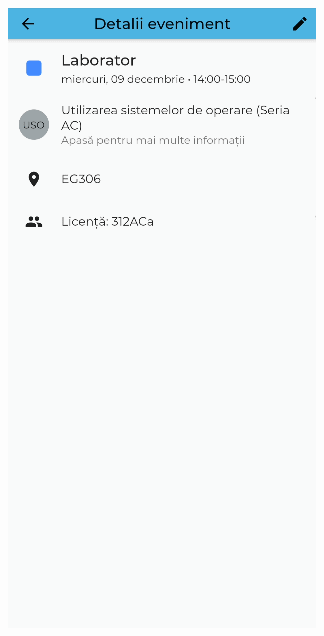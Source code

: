 \begin{figure}[!ht]
    \centering
    \begin{minipage}[b]{0.26\textwidth}
        \captionsetup{justification=centering}
        \includegraphics[width=\textwidth]{figures/beforedev/image19.png}

\end{minipage}
\end{figure}

